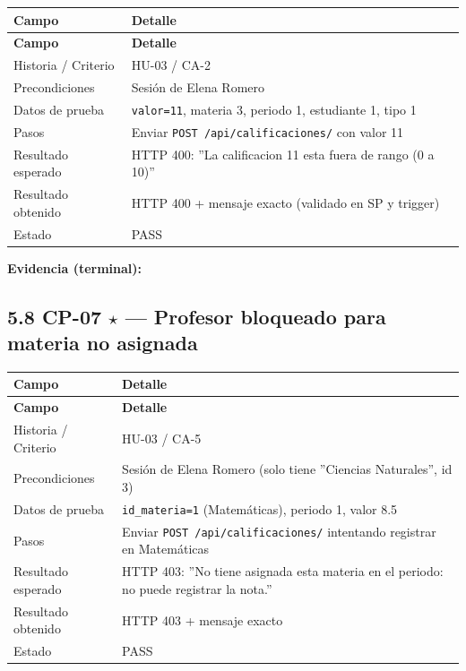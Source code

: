 \documentclass[11pt,a4paper]{article}
\begin{document}
{\small
\begin{longtable}{|p{}|p{}|}
\rowcolor{UTECblue}\color{white}\bfseries Campo & \color{white}\bfseries Detalle \\ \hline
\endfirsthead
\rowcolor{UTECblue}\color{white}\bfseries Campo & \color{white}\bfseries Detalle \\ \hline
\endhead
Historia / Criterio & HU-03 / CA-2 \\ \hline
Precondiciones & Sesión de Elena Romero \\ \hline
Datos de prueba & \texttt{valor=11}, materia 3, periodo 1, estudiante 1, tipo 1 \\ \hline
Pasos & Enviar \texttt{POST /api/calificaciones/} con valor 11 \\ \hline
Resultado esperado & HTTP 400: ''La calificacion 11 esta fuera de rango (0 a 10)'' \\ \hline
Resultado obtenido & HTTP 400 + mensaje exacto (validado en SP y trigger) \\ \hline
Estado & {\color{green!60!black}{$\checkmark$}} PASS \\ \hline
\end{longtable}}


\textbf{Evidencia (terminal):}


\subsection*{5.8 CP-07 {$\star$} --- Profesor bloqueado para materia no asignada}


{\small
\begin{longtable}{|p{}|p{}|}
\rowcolor{UTECblue}\color{white}\bfseries Campo & \color{white}\bfseries Detalle \\ \hline
\endfirsthead
\rowcolor{UTECblue}\color{white}\bfseries Campo & \color{white}\bfseries Detalle \\ \hline
\endhead
Historia / Criterio & HU-03 / CA-5 \\ \hline
Precondiciones & Sesión de Elena Romero (solo tiene ''Ciencias Naturales'', id 3) \\ \hline
Datos de prueba & \texttt{id\_materia=1} (Matemáticas), periodo 1, valor 8.5 \\ \hline
Pasos & Enviar \texttt{POST /api/calificaciones/} intentando registrar en Matemáticas \\ \hline
Resultado esperado & HTTP 403: ''No tiene asignada esta materia en el periodo: no puede registrar la nota.'' \\ \hline
Resultado obtenido & HTTP 403 + mensaje exacto \\ \hline
Estado & {\color{green!60!black}{$\checkmark$}} PASS \\ \hline
\end{longtable}}
\end{document}
